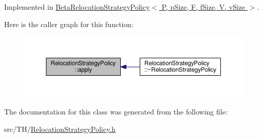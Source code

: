 Implemented in \hyperlink{classBetaRelocationStrategyPolicy_aeadaa254d012725ab1a67419d9cb37ef}{Beta\+Relocation\+Strategy\+Policy$<$ P, p\+Size, F, f\+Size, V, v\+Size $>$}.



Here is the caller graph for this function\+:\nopagebreak
\begin{figure}[H]
\begin{center}
\leavevmode
\includegraphics[width=350pt]{classRelocationStrategyPolicy_ab1de627ca81a24739d942806cfed27e0_icgraph}
\end{center}
\end{figure}




The documentation for this class was generated from the following file\+:\begin{DoxyCompactItemize}
\item 
src/\+T\+H/\hyperlink{RelocationStrategyPolicy_8h}{Relocation\+Strategy\+Policy.\+h}\end{DoxyCompactItemize}

